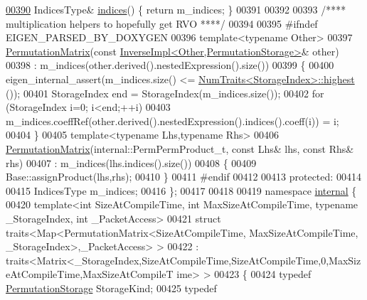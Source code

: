 \begin{DoxyCode}
\hyperlink{group___core___module_ac089ead468a58d75f276ad2b253578c0}{00390}     IndicesType& \hyperlink{group___core___module_ac089ead468a58d75f276ad2b253578c0}{indices}() \{ \textcolor{keywordflow}{return} m\_indices; \}
00391 
00392 
00393     \textcolor{comment}{/**** multiplication helpers to hopefully get RVO ****/}
00394 
00395 \textcolor{preprocessor}{#ifndef EIGEN\_PARSED\_BY\_DOXYGEN}
00396     \textcolor{keyword}{template}<\textcolor{keyword}{typename} Other>
00397     \hyperlink{group___core___module_class_eigen_1_1_permutation_matrix}{PermutationMatrix}(\textcolor{keyword}{const} 
      \hyperlink{class_eigen_1_1_inverse_impl}{InverseImpl<Other,PermutationStorage>}& other)
00398       : m\_indices(other.derived().nestedExpression().size())
00399     \{
00400       eigen\_internal\_assert(m\_indices.size() <= \hyperlink{group___core___module_struct_eigen_1_1_num_traits}{NumTraits<StorageIndex>::highest}
      ());
00401       StorageIndex end = StorageIndex(m\_indices.size());
00402       \textcolor{keywordflow}{for} (StorageIndex i=0; i<end;++i)
00403         m\_indices.coeffRef(other.derived().nestedExpression().indices().coeff(i)) = i;
00404     \}
00405     \textcolor{keyword}{template}<\textcolor{keyword}{typename} Lhs,\textcolor{keyword}{typename} Rhs>
00406     \hyperlink{group___core___module_class_eigen_1_1_permutation_matrix}{PermutationMatrix}(internal::PermPermProduct\_t, \textcolor{keyword}{const} Lhs& lhs, \textcolor{keyword}{const} Rhs& rhs)
00407       : m\_indices(lhs.indices().size())
00408     \{
00409       Base::assignProduct(lhs,rhs);
00410     \}
00411 \textcolor{preprocessor}{#endif}
00412 
00413   \textcolor{keyword}{protected}:
00414 
00415     IndicesType m\_indices;
00416 \};
00417 
00418 
00419 \textcolor{keyword}{namespace }\hyperlink{namespaceinternal}{internal} \{
00420 \textcolor{keyword}{template}<\textcolor{keywordtype}{int} SizeAtCompileTime, \textcolor{keywordtype}{int} MaxSizeAtCompileTime, \textcolor{keyword}{typename} \_StorageIndex, \textcolor{keywordtype}{int} \_PacketAccess>
00421 \textcolor{keyword}{struct }traits<Map<PermutationMatrix<SizeAtCompileTime, MaxSizeAtCompileTime, \_StorageIndex>,\_PacketAccess> 
      >
00422  : traits<Matrix<\_StorageIndex,SizeAtCompileTime,SizeAtCompileTime,0,MaxSizeAtCompileTime,MaxSizeAtCompileT
      ime> >
00423 \{
00424   \textcolor{keyword}{typedef} \hyperlink{struct_eigen_1_1_permutation_storage}{PermutationStorage} StorageKind;
00425   \textcolor{keyword}{typedef} 

\end{DoxyCode}
